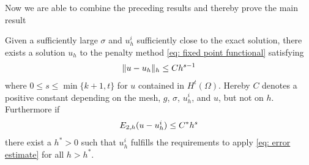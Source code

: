 %

Now we are able to combine the preceding results and thereby prove the main result
\begin{theorem}\label{main result}
	Given a sufficiently large $\sigma$ and $u_h^i$ sufficiently close to the exact solution, there exists a solution $u_h$ to the penalty method \eqref{eq: fixed point functional} satisfying
	\begin{align}
		\lVert u-u_h \rVert_{h} \leq C h^{s-1} \label{eq: error estimate}
	\end{align}
	where $0 \leq s \leq \min\{k+1, t\}$ for $u$ contained in $H^t(\Omega)$. Hereby $C$ denotes a positive constant depending on the mesh, $g$, $\sigma$, $u^i_h$, and $u$, but not on $h$.\\
	Furthermore if
	\begin{align}
		E_{2,h}(u-u_h^i) \leq C^* h^{s} \label{eq: estimate error}
	\end{align}
	there exist a $h^*> 0$ such that $u_h^i$ fulfills the requirements to apply \eqref{eq: error estimate} for all $h > h^*$.
	
\end{theorem}
